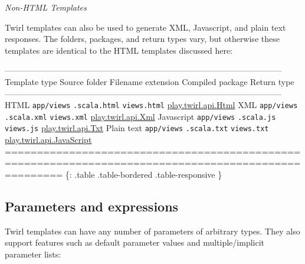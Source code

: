 \documentclass[oneside,11pt,a4paper,]{book}
\begin{document}
\begin{WarningCallout}

\emph{Non-HTML Templates}

Twirl templates can also be used to generate XML, Javascript, and plain
text responses. The folders, packages, and return types vary, but
otherwise these templates are identical to the HTML templates discussed
here:

\textbar{}-----------------------------------------------------------------------------------------------------\textbar{}
\textbar{} Template type \textbar{} Source folder \textbar{} Filename
extension \textbar{} Compiled package \textbar{} Return type \textbar{}
\textbar{}-----------------------------------------------------------------------------------------------------\textbar{}
\textbar{} HTML \textbar{} \texttt{app/views} \textbar{}
\texttt{.scala.html} \textbar{} \texttt{views.html} \textbar{}
\href{https://github.com/playframework/twirl/blob/master/api/src/main/scala/play/twirl/api/Formats.scala}{play.twirl.api.Html}
\textbar{} \textbar{} XML \textbar{} \texttt{app/views} \textbar{}
\texttt{.scala.xml} \textbar{} \texttt{views.xml} \textbar{}
\href{https://github.com/playframework/twirl/blob/master/api/src/main/scala/play/twirl/api/Formats.scala}{play.twirl.api.Xml}
\textbar{} \textbar{} Javascript \textbar{} \texttt{app/views}
\textbar{} \texttt{.scala.js} \textbar{} \texttt{views.js} \textbar{}
\href{https://github.com/playframework/twirl/blob/master/api/src/main/scala/play/twirl/api/Formats.scala}{play.twirl.api.Txt}
\textbar{} \textbar{} Plain text \textbar{} \texttt{app/views}
\textbar{} \texttt{.scala.txt} \textbar{} \texttt{views.txt} \textbar{}
\href{https://github.com/playframework/twirl/blob/master/api/src/main/scala/play/twirl/api/Formats.scala}{play.twirl.api.JavaScript}
\textbar{}
\textbar{}=====================================================================================================\textbar{}
\{: .table .table-bordered .table-responsive \}

\end{WarningCallout}

\subsection{Parameters and
expressions}\label{parameters-and-expressions}

Twirl templates can have any number of parameters of arbitrary types.
They also support features such as default parameter values and
multiple/implicit parameter lists:
\end{document}
